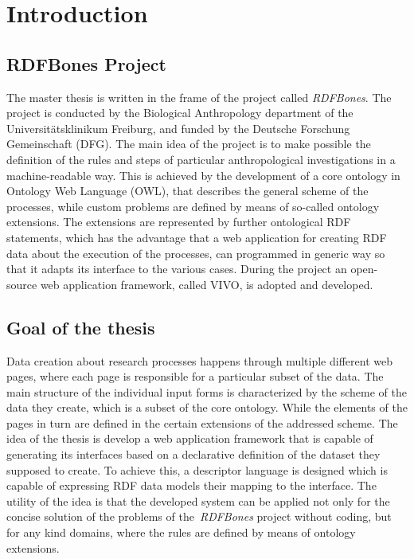 \chapter{Introduction}


\section{RDFBones Project}

The master thesis is written in the frame of the project called \textit{RDFBones}. The project is conducted by the Biological Anthropology department of the Universitätsklinikum Freiburg, and funded by the Deutsche Forschung Gemeinschaft (DFG). The main idea of the project is to make possible the definition of the rules and steps of particular anthropological investigations in a machine-readable way. This is achieved by the development of a core ontology in Ontology Web Language (OWL), that describes the general scheme of the processes, while custom problems are defined by means of so-called ontology extensions. The extensions are represented by further ontological RDF statements, which has the advantage that a web application for creating RDF data about the execution of the processes, can programmed in generic way so that it adapts its interface to the various cases. During the project an open-source web application framework, called VIVO, is adopted and developed.

\section{Goal of the thesis}

Data creation about research processes happens through multiple different web pages, where each page is responsible for a particular subset of the data. The main structure of the individual input forms is characterized by the scheme of the data they create, which is a subset of the core ontology. While the elements of the pages in turn are defined in the certain extensions of the addressed scheme. The idea of the thesis is develop a web application framework that is capable of generating its interfaces based on a declarative definition of the dataset they supposed to create. To achieve this, a descriptor language is designed which is capable of expressing RDF data models  their mapping to the interface. The utility of the idea is that the developed system can be applied not only for the concise solution of the problems of the \textit{RDFBones} project without coding, but for any kind domains, where the rules are defined by means of ontology extensions.


